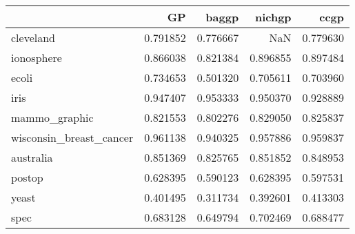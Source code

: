 \begin{tabular}{lrrrr}
\toprule
{} &        GP &     baggp &    nichgp &      ccgp \\
\midrule
cleveland               &  0.791852 &  0.776667 &       NaN &  0.779630 \\
ionosphere              &  0.866038 &  0.821384 &  0.896855 &  0.897484 \\
ecoli                   &  0.734653 &  0.501320 &  0.705611 &  0.703960 \\
iris                    &  0.947407 &  0.953333 &  0.950370 &  0.928889 \\
mammo\_graphic           &  0.821553 &  0.802276 &  0.829050 &  0.825837 \\
wisconsin\_breast\_cancer &  0.961138 &  0.940325 &  0.957886 &  0.959837 \\
australia               &  0.851369 &  0.825765 &  0.851852 &  0.848953 \\
postop                  &  0.628395 &  0.590123 &  0.628395 &  0.597531 \\
yeast                   &  0.401495 &  0.311734 &  0.392601 &  0.413303 \\
spec                    &  0.683128 &  0.649794 &  0.702469 &  0.688477 \\
\bottomrule
\end{tabular}
